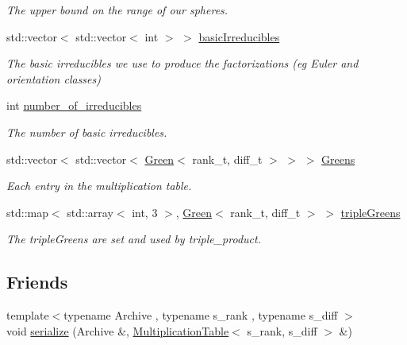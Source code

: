 \begin{DoxyCompactItemize}
\begin{DoxyCompactList}\small\item\em The upper bound on the range of our spheres. \end{DoxyCompactList}\item 
std\+::vector$<$ std\+::vector$<$ int $>$ $>$ \hyperlink{classMackey_1_1MultiplicationTable_af6896ea01c087e71533de423d7cf65ac}{basic\+Irreducibles}
\begin{DoxyCompactList}\small\item\em The basic irreducibles we use to produce the factorizations (eg Euler and orientation classes) \end{DoxyCompactList}\item 
int \hyperlink{classMackey_1_1MultiplicationTable_a2a87b9a2f25f4e99c903c8f874fad4fb}{number\+\_\+of\+\_\+irreducibles}
\begin{DoxyCompactList}\small\item\em The number of basic irreducibles. \end{DoxyCompactList}\item 
std\+::vector$<$ std\+::vector$<$ \hyperlink{classMackey_1_1Green}{Green}$<$ rank\+\_\+t, diff\+\_\+t $>$ $>$ $>$ \hyperlink{classMackey_1_1MultiplicationTable_ac9a42c7d9c520844c0d1c91051ae750e}{Greens}
\begin{DoxyCompactList}\small\item\em Each entry in the multiplication table. \end{DoxyCompactList}\item 
std\+::map$<$ std\+::array$<$ int, 3 $>$, \hyperlink{classMackey_1_1Green}{Green}$<$ rank\+\_\+t, diff\+\_\+t $>$ $>$ \hyperlink{classMackey_1_1MultiplicationTable_af6b2afae20bd4a120e9792d1a9dce837}{triple\+Greens}
\begin{DoxyCompactList}\small\item\em The triple\+Greens are set and used by triple\+\_\+product. \end{DoxyCompactList}\end{DoxyCompactItemize}
\subsection*{Friends}
\begin{DoxyCompactItemize}
\item 
{\footnotesize template$<$typename Archive , typename s\+\_\+rank , typename s\+\_\+diff $>$ }\\void \hyperlink{classMackey_1_1MultiplicationTable_a2b1db64d5f5749a0a14483ef730b755c}{serialize} (Archive \&, \hyperlink{classMackey_1_1MultiplicationTable}{Multiplication\+Table}$<$ s\+\_\+rank, s\+\_\+diff $>$ \&)
\end{DoxyCompactItemize}


